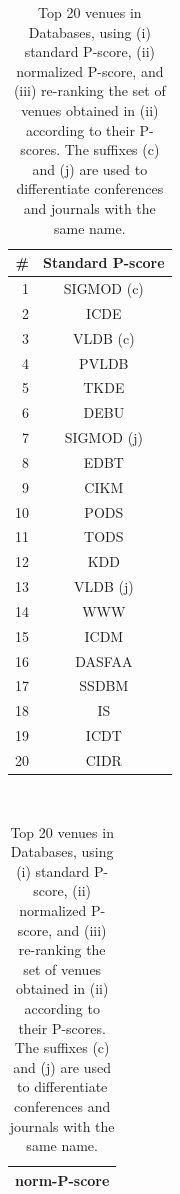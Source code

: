 \begin{table}[htbp]
\centering
\caption{Top 20 venues in Databases, using (i) standard P-score, (ii) normalized P-score, and (iii) re-ranking the set of venues obtained in (ii) according to their P-scores. The suffixes (c) and (j) are used to differentiate conferences and journals with the same name.}
\label{tab:db-venues}
\begin{tabular}{rc}
\toprule
\#		&	Standard P-score \\ 
\midrule
1		&		SIGMOD (c)	\\
2		&		ICDE		\\
3		&		VLDB (c)	\\
4		&		PVLDB		\\
5		&		TKDE		\\
6		&		DEBU		\\
7		&		SIGMOD (j)	\\
8		&		EDBT		\\
9		&		CIKM		\\
10		&		PODS		\\
11		&		TODS		\\
12		&		KDD			\\
13		&		VLDB (j)	\\
14		&		WWW			\\
15		&		ICDM		\\
16		&		DASFAA		\\
17		&		SSDBM		\\
18		&		IS			\\
19		&		ICDT		\\
20		&		CIDR		\\
\bottomrule
\end{tabular} \ \ 
\begin{tabular}{c}
\toprule
norm-P-score \\ 
\midrule

\end{tabular}
\end{table}
